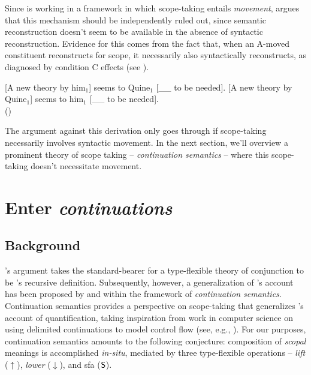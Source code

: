 \documentclass[cronos]{ling-paper}
\begin{document}
Since \citeauthor{hirschThesis} is working in a framework in which
scope-taking entails \textit{movement}, \citeauthor{hirschThesis} argues that
this mechanism should be independently ruled out, since semantic reconstruction
doesn't seem to be available in the absence of syntactic reconstruction.
Evidence for this comes from the fact that, when an A-moved constituent
reconstructs for scope, it necessarily also syntactically reconstructs, as
diagnosed by condition C effects (see \citealt{romero1998}).

\pex
\a{}[A new theory by him$_{1}$] seems to Quine$_{1}$ [\_\_ to be needed].
\a\ljudge{*}{}[A new theory by Quine$_{1}$] seems to him$_{1}$ [\_\_ to be needed].\\
\phantom{,}\hfill(\citealt[p.\,95]{hirschThesis})
\xe

The argument against this derivation only goes through if scope-taking
necessarily involves syntactic movement. In the next section, we'll overview a prominent theory of scope taking -- \textit{continuation semantics} -- where this scope-taking doesn't necessitate movement.

\section{Enter \textit{continuations}}

\subsection{Background}

\citeauthor{hirschThesis}'s argument takes the standard-bearer for a
type-flexible theory of conjunction to be \citeauthor{parteeRooth}'s recursive
definition. Subsequently, however, a generalization of
\citeauthor{parteeRooth}'s account has been proposed by \citet{barker2002} and
\citet{barkerShan2015} within the framework of \textit{continuation semantics}.
Continuation semantics provides a perspective on scope-taking that generalizes
\citeauthor{montague1973}'s account of quantification, taking inspiration from
work in computer science on using delimited continuations to model control flow
(see, e.g., \citealt{danvyFilinski1992,wadler1994}). For our purposes,
continuation semantics amounts to the following conjecture: composition of
\textit{scopal} meanings is accomplished \textit{in-situ}, mediated by three
type-flexible operations -- \textit{lift} ($↑$), \textit{lower} ($↓$), and
\ac{sfa} ($\textsf{S}$).
\end{document}
